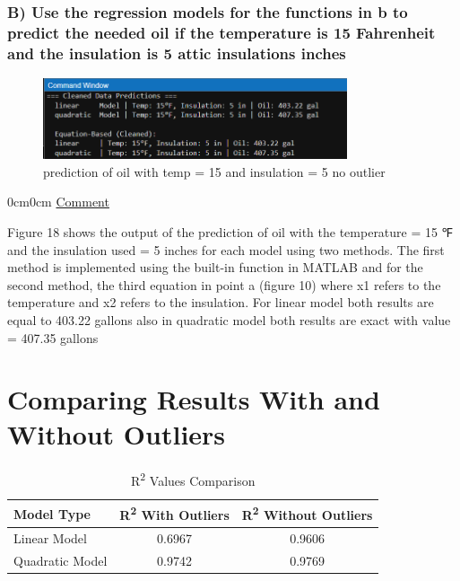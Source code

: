 \documentclass[12pt]{article}
\begin{document}
\subsubsection*{B) Use the regression models for the functions in b to predict the needed oil if the
temperature is 15 Fahrenheit and the insulation is 5 attic insulations inches}


\begin{figure}[H]
    \centering
    \includegraphics[width=0.8\textwidth]{18.png}
    \caption{prediction of oil with temp = 15 and insulation = 5 no outlier}
\end{figure}
\begin{adjustwidth} {0cm}{0cm}
\uline{Comment}
\end{adjustwidth}
Figure 18 shows the output of the prediction of oil with the temperature = 15 ℉ and the
insulation used = 5 inches for each model using two methods. The first method is
implemented using the built-in function in MATLAB and for the second method, the third
equation in point a (figure 10) where x1 refers to the temperature and x2 refers to the
insulation. For linear model both results are equal to 403.22 gallons also in quadratic
model both results are exact with value = 407.35 gallons


\section*{Comparing Results With and Without Outliers}
\begin{table}[h!]
    \centering
    \caption{R\textsuperscript{2} Values Comparison}
    \begin{tabular}{lcc}
        \toprule
        \textbf{Model Type} & \textbf{R\textsuperscript{2} With Outliers} & \textbf{R\textsuperscript{2} Without Outliers} \\
        \midrule
        Linear Model & 0.6967 & 0.9606 \\
        Quadratic Model & 0.9742 & 0.9769 \\
        \bottomrule
    \end{tabular}
\end{table}
\end{document}
